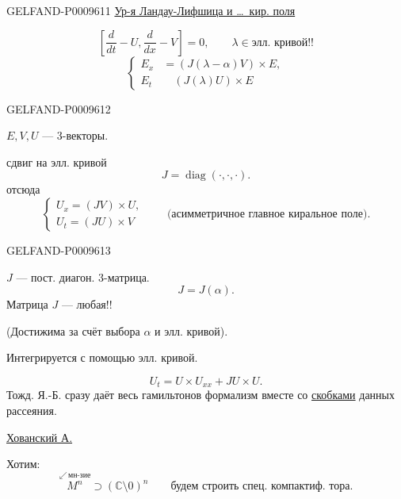 \begin{GelfandAdjacentEvidence}{GELFAND-P000961}{1}
\underline{Ур-я Ландау-Лифшица и \ldots\ кир. поля}

\begin{equation*}
 \left[\frac{d}{dt}-U,\frac{d}{dx}-V\right]=0,
 \qquad \lambda\in\text{элл. кривой!!}\tag{7}
\end{equation*}
\begin{equation*}
 \left\{\begin{aligned}
 E_x&=(J(\lambda-\alpha)V)\times E,\\
 E_t&\quad (J(\lambda)U)\times E
 \end{aligned}\right.\tag{8}
\end{equation*}
\end{GelfandAdjacentEvidence}
\begin{GelfandAdjacentEvidence}{GELFAND-P000961}{2}


$E,V,U$ --- 3-векторы.

сдвиг на элл. кривой
\[
 J=\operatorname{diag}(\cdot,\cdot,\cdot).
\]
отсюда
\begin{equation*}
 \begin{cases}
 U_x=(JV)\times U,\\
 U_t=(JU)\times V
 \end{cases}
 \qquad\text{(асимметричное главное киральное поле).}\tag{9}
\end{equation*}
\end{GelfandAdjacentEvidence}
\begin{GelfandAdjacentEvidence}{GELFAND-P000961}{3}


$J$ --- пост. диагон. 3-матрица.
\[
 J=J(\alpha).
\]
Матрица $J$ --- любая!!

(Достижима за счёт выбора $\alpha$ и элл. кривой).

Интегрируется с помощью элл. кривой.

\begin{equation*}
 U_t=U\times U_{xx}+JU\times U.\tag{10}
\end{equation*}
Тожд. Я.-Б. сразу даёт весь гамильтонов формализм вместе со \underline{скобками} данных рассеяния.

\underline{\underline{Хованский А.}}

Хотим:
\[
 \overset{\swarrow\,\text{мн-зие}}{M^n}\supset(\mathbb{C}\setminus0)^n
 \qquad\text{будем строить спец. компактиф. тора.}
\]
\end{GelfandAdjacentEvidence}
